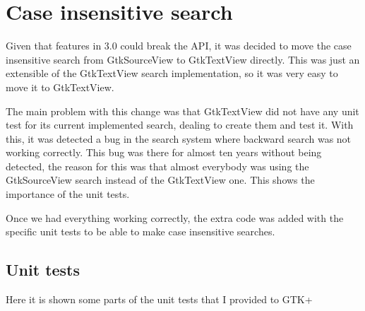 \newpage
\section{Case insensitive search}

Given that features in 3.0 could break the API, it was decided to move the case insensitive search from GtkSourceView 
to GtkTextView directly. This was just an extensible of the GtkTextView search implementation, so it was very easy to move it to GtkTextView.

The main problem with this change  was that GtkTextView did not have any unit test for its current implemented search, 
dealing to create them and test it.   With this, it was detected a bug in the search system where backward search was 
not working correctly. This bug was there for almost ten years without being detected, the reason for this was that 
almost everybody was using the GtkSourceView search instead of the GtkTextView one. This shows the importance of the unit tests.

Once we had everything working correctly, the extra code was added with the specific unit tests to be able to make 
case insensitive searches.

\subsection{Unit tests}

Here it is shown some parts of the unit tests that I provided to GTK+

